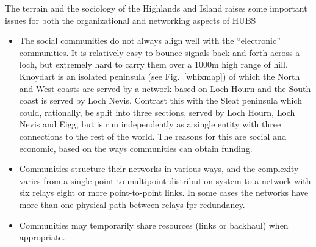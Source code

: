 The terrain and the sociology of the Highlands and Island raises some important issues for both the organizational and networking aspects of HUBS
\begin{itemize} 
\item The social communities do not always align well with the ``electronic'' communities. It is relatively easy to bounce signals back and forth across a loch, but extremely hard to carry them over a 1000m high range of hill.  Knoydart is an isolated peninsula (see Fig.~\ref{whixmap})  of which the North and West coasts are served by a network based on Loch Hourn and the South coast is served by Loch Nevis.  Contrast this with the Sleat peninsula which could, rationally,  be split into three sections, served by Loch Hourn, Loch Nevis and Eigg, but is run independently as a single entity with three connections to the rest of the world.  The reasons for this are social and economic, based on the ways communities can obtain funding.
\item Communities structure their networks in various ways, and the complexity varies from a single point-to multipoint distribution system to a network with six relays  eight or more point-to-point links.  In some cases the networks have more than one physical path between relays fpr redundancy.
\item Communities may temporarily share resources (links or backhaul) when appropriate.
\end{itemize}

